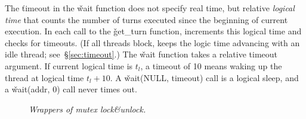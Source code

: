 
The \v{timeout} in the \v{wait} function does not specify real time, but relative \emph{logical time} that
counts the number of turns executed since the beginning of current
execution.  In each call to the \v{get\_turn} function, \parrot increments this logical
time and checks for timeouts. 
(If all threads block, \parrot keeps the logic time advancing with an idle
thread; see~\S\ref{sec:timeout}.)
The \v{wait} function takes a relative timeout argument.  If
current logical time is $t_l$, a timeout of 10 means waking up the thread
at logical time $t_l + 10$. A \v{wait(NULL, timeout)} 
call is a logical sleep, and a \v{wait(addr, 0)} call never times out.

\begin{figure}[t]
\centering
\begin{minipage}[t]{.38\textwidth}
\end{minipage}
\vspace{-1 mm}
\caption{{\em Wrappers of \pthread mutex lock\&unlock.}} \label{fig:lock}
\vspace{-0.0in}
\end{figure}

